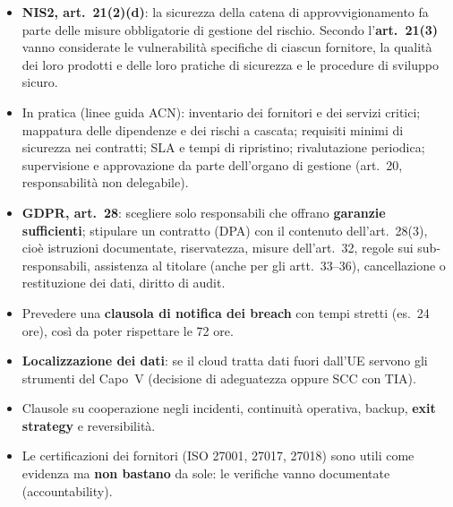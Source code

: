 \begin{soluzione}
\begin{itemize}
  \item \textbf{NIS2, art.~21(2)(d)}: la sicurezza della catena di approvvigionamento fa parte delle
    misure obbligatorie di gestione del rischio. Secondo l'\textbf{art.~21(3)} vanno considerate le
    vulnerabilità specifiche di ciascun fornitore, la qualità dei loro prodotti e delle loro pratiche di
    sicurezza e le procedure di sviluppo sicuro.
  \item In pratica (linee guida ACN): inventario dei fornitori e dei servizi critici; mappatura delle
    dipendenze e dei rischi a cascata; requisiti minimi di sicurezza nei contratti; SLA e tempi di
    ripristino; rivalutazione periodica; supervisione e approvazione da parte dell'organo di gestione
    (art.~20, responsabilità non delegabile).
  \item \textbf{GDPR, art.~28}: scegliere solo responsabili che offrano \textbf{garanzie sufficienti};
    stipulare un contratto (DPA) con il contenuto dell'art.~28(3), cioè istruzioni documentate,
    riservatezza, misure dell'art.~32, regole sui sub-responsabili, assistenza al titolare (anche per
    gli artt.~33--36), cancellazione o restituzione dei dati, diritto di audit.
  \item Prevedere una \textbf{clausola di notifica dei breach} con tempi stretti (es.\ 24 ore), così da
    poter rispettare le 72 ore.
  \item \textbf{Localizzazione dei dati}: se il cloud tratta dati fuori dall'UE servono gli strumenti
    del Capo~V (decisione di adeguatezza oppure SCC con TIA).
  \item Clausole su cooperazione negli incidenti, continuità operativa, backup, \textbf{exit strategy}
    e reversibilità.
  \item Le certificazioni dei fornitori (ISO 27001, 27017, 27018) sono utili come evidenza ma
    \textbf{non bastano} da sole: le verifiche vanno documentate (accountability).
\end{itemize}
\end{soluzione}
